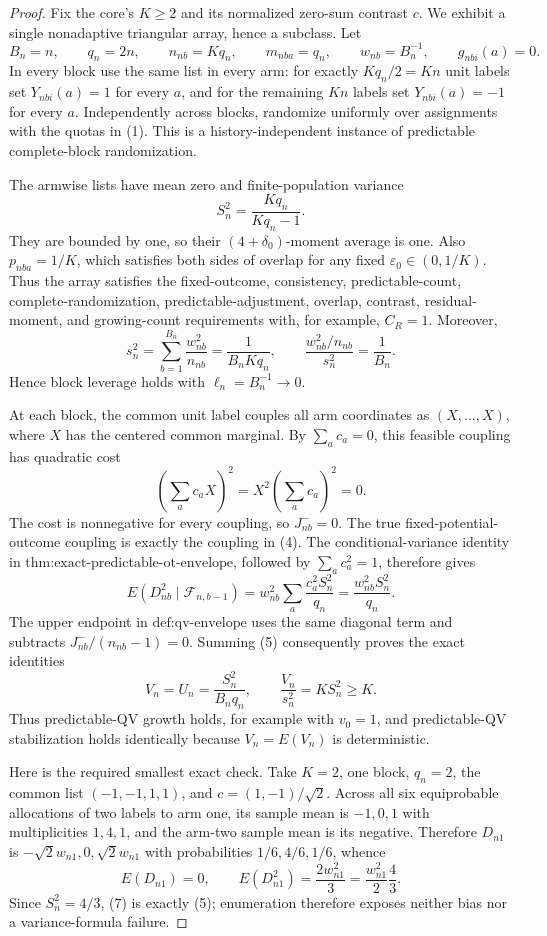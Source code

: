 \documentclass{article}
\begin{document}
\begin{proof}
Fix the core's \(K\ge2\) and its normalized zero-sum contrast \(c\).  We exhibit a single nonadaptive triangular array, hence a subclass.  Let
\[
B_n=n,\qquad q_n=2n,\qquad n_{nb}=Kq_n,\qquad
m_{nba}=q_n,\qquad w_{nb}=B_n^{-1},\qquad g_{nbi}(a)=0.
\tag{1}
\]
In every block use the same list in every arm: for exactly \(Kq_n/2=Kn\) unit labels set \(Y_{nbi}(a)=1\) for every \(a\), and for the remaining \(Kn\) labels set \(Y_{nbi}(a)=-1\) for every \(a\).  Independently across blocks, randomize uniformly over assignments with the quotas in (1).  This is a history-independent instance of predictable complete-block randomization.

The armwise lists have mean zero and finite-population variance
\[
S_n^2=\frac{Kq_n}{Kq_n-1}.
\tag{2}
\]
They are bounded by one, so their \((4+\delta_0)\)-moment average is one.  Also \(p_{nba}=1/K\), which satisfies both sides of overlap for any fixed \(\varepsilon_0\in(0,1/K)\).  Thus the array satisfies the fixed-outcome, consistency, predictable-count, complete-randomization, predictable-adjustment, overlap, contrast, residual-moment, and growing-count requirements with, for example, \(C_R=1\).  Moreover,
\[
s_n^2=\sum_{b=1}^{B_n}\frac{w_{nb}^2}{n_{nb}}
=\frac1{B_nKq_n},
\qquad
\frac{w_{nb}^2/n_{nb}}{s_n^2}=\frac1{B_n}.
\tag{3}
\]
Hence block leverage holds with \(\ell_n=B_n^{-1}\to0\).

At each block, the common unit label couples all arm coordinates as \((X,\ldots,X)\), where \(X\) has the centered common marginal.  By \(\sum_ac_a=0\), this feasible coupling has quadratic cost
\[
\left(\sum_ac_aX\right)^2=X^2\left(\sum_ac_a\right)^2=0.
\tag{4}
\]
The cost is nonnegative for every coupling, so \(J_{nb}^{-}=0\).  The true fixed-potential-outcome coupling is exactly the coupling in (4).  The conditional-variance identity in \(\text{thm:exact-predictable-ot-envelope}\), followed by \(\sum_ac_a^2=1\), therefore gives
\[
E(D_{nb}^2\mid\mathcal F_{n,b-1})
=w_{nb}^2\sum_a\frac{c_a^2S_n^2}{q_n}
=\frac{w_{nb}^2S_n^2}{q_n}.
\tag{5}
\]
The upper endpoint in \(\text{def:qv-envelope}\) uses the same diagonal term and subtracts \(J_{nb}^{-}/(n_{nb}-1)=0\).  Summing (5) consequently proves the exact identities
\[
V_n=U_n=\frac{S_n^2}{B_nq_n},
\qquad
\frac{V_n}{s_n^2}=KS_n^2\ge K.
\tag{6}
\]
Thus predictable-QV growth holds, for example with \(v_0=1\), and predictable-QV stabilization holds identically because \(V_n=E(V_n)\) is deterministic.

Here is the required smallest exact check.  Take \(K=2\), one block, \(q_n=2\), the common list \((-1,-1,1,1)\), and \(c=(1,-1)/\sqrt2\).  Across all six equiprobable allocations of two labels to arm one, its sample mean is \(-1,0,1\) with multiplicities \(1,4,1\), and the arm-two sample mean is its negative.  Therefore \(D_{n1}\) is \(-\sqrt2w_{n1},0,\sqrt2w_{n1}\) with probabilities \(1/6,4/6,1/6\), whence
\[
E(D_{n1})=0,
\qquad
E(D_{n1}^2)=\frac{2w_{n1}^2}{3}
=\frac{w_{n1}^2}{2}\frac43.
\tag{7}
\]
Since \(S_n^2=4/3\), (7) is exactly (5); enumeration therefore exposes neither bias nor a variance-formula failure.


\end{proof}
\end{document}

